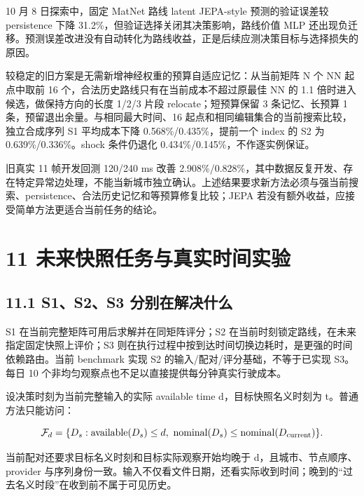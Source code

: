 \documentclass[UTF8,10pt,a4paper,fontset=fandol]{ctexart}
\begin{document}
10 月 8 日探索中，固定 MatNet 路线 latent JEPA-style 预测的验证误差较 persistence 下降 31.2\%，但验证选择关闭其决策影响，路线价值 MLP 还出现负迁移。预测误差改进没有自动转化为路线收益，正是后续应测决策目标与选择损失的原因。


较稳定的旧方案是无需新增神经权重的预算自适应记忆：从当前矩阵 N 个 NN 起点中取前 16 个，合法历史路线只有在当前成本不超过原最佳 NN 的 1.1 倍时进入候选，做保持方向的长度 1/\allowbreak{}2/\allowbreak{}3 片段 relocate；短预算保留 3 条记忆、长预算 1 条，预留退出余量。与相同最大时间、16 起点和相同编辑集合的当前搜索比较，独立合成序列 S1 平均成本下降 0.568\%/\allowbreak{}0.435\%，提前一个 index 的 S2 为 0.639\%/\allowbreak{}0.336\%。shock 条件仍退化 0.434\%/\allowbreak{}0.145\%，不作逐实例保证。


旧真实 11 帧开发回测 120/\allowbreak{}240 ms 改善 2.908\%/\allowbreak{}0.828\%，其中数据反复开发、存在特定异常边处理，不能当新城市独立确认。上述结果要求新方法必须与强当前搜索、persistence、合法历史记忆和等预算修复比较；JEPA 若没有额外收益，应接受简单方法更适合当前任务的结论。


\section*{11 未来快照任务与真实时间实验}


\subsection*{11.1 S1、S2、S3 分别在解决什么}


S1 在当前完整矩阵可用后求解并在同矩阵评分；S2 在当前时刻锁定路线，在未来指定固定快照上评价；S3 则在执行过程中按到达时间切换边耗时，是更强的时间依赖路由。当前 benchmark 实现 S2 的输入/\allowbreak{}配对/\allowbreak{}评分基础，不等于已实现 S3。每日 10 个非均匀观察点也不足以直接提供每分钟真实行驶成本。


设决策时刻为当前完整输入的实际 available time d，目标快照名义时刻为 t。普通方法只能访问：


\begin{equation}
\mathcal F_d=
\{D_s:\operatorname{available}(D_s)\le d,\ 
\operatorname{nominal}(D_s)\le\operatorname{nominal}(D_{\rm current})\}.
\end{equation}

当前配对还要求目标名义时刻和目标实际观察开始均晚于 d，且城市、节点顺序、provider 与序列身份一致。输入不仅看文件日期，还看实际收到时间；晚到的“过去名义时段”在收到前不属于可见历史。
\end{document}
